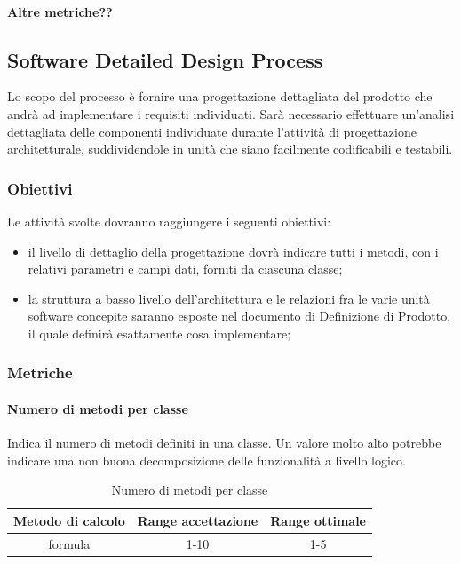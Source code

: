 			\paragraph{Altre metriche??}
	
	\subsection{Software Detailed Design Process}
	Lo scopo del processo è fornire una progettazione dettagliata del prodotto che andrà ad implementare i requisiti individuati.
	Sarà necessario effettuare un’analisi dettagliata delle componenti individuate durante l'attività di progettazione
	architetturale, suddividendole in unità che siano facilmente codificabili e testabili.
		\subsubsection{Obiettivi}
		Le attività svolte dovranno raggiungere i seguenti obiettivi:
		\begin{itemize}
			\item il livello di dettaglio della progettazione dovrà indicare tutti i metodi, con i relativi parametri e campi dati, forniti da ciascuna classe;
			\item la struttura a basso livello dell’architettura e le relazioni fra le varie unità software concepite saranno esposte nel documento di Definizione di Prodotto, il quale definirà esattamente cosa implementare;
		\end{itemize}
		
		\subsubsection{Metriche}
			\paragraph{Numero di metodi per classe}
			Indica il numero di metodi definiti in una classe.
			Un valore molto alto potrebbe indicare una
			non buona decomposizione delle funzionalità a livello logico.
			\begin{table}[H]
				\begin{center}
					\begin{tabular}{|c|c|c|}
						\hline
						\textbf{Metodo di calcolo} & \textbf{Range accettazione} & \textbf{Range ottimale} \\
						\hline
						formula & 1-10  & 1-5 \\
						\hline
					\end{tabular}
				\end{center}
				\caption{Numero di metodi per classe}
			\end{table}
		
